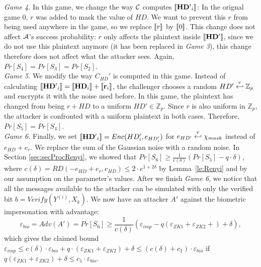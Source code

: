 \textit{Game 4.} In this game, we change the way $\mathcal{C}$ computes
$\left\llbracket\mathbf{HD'}_{i}\right\rrbracket$: In the orignal game 0, $r$ was added to mask the value
of $HD$. We want to prevent this $r$ from being used anywhere in the game, so we
replace $\left\llbracket r\right\rrbracket$ by $\left\llbracket0\right\rrbracket$. This change does not affect $\mathcal{A}$'s
success probability: $r$ only affects the plaintext inside $\left\llbracket\mathbf{HD'}\right\rrbracket$,
since we do not use this plaintext anymore (it has been replaced in \textit{Game
  3}), this
change therefore does not affect what the attacker sees. Again, $Pr[S_4] = Pr[S_3] = Pr[S_2]$.\\


\textit{Game 5.} We modify the way $C_{HD}'$ is computed in this game. Instead
of calculating
$\left\llbracket\mathbf{HD'}_{i}\right\rrbracket = \left\llbracket\mathbf{HD}_{i}\right\rrbracket + \left\llbracket\mathbf{r}_{i}\right\rrbracket$, the
challenger chooses a random $HD' \stackrel{r}{\hookleftarrow} \mathbb{Z}_p$ and encrypts it
with the noise used before. In this game, the plaintext has changed from being
$r + HD$ to a uniform $HD' \in \mathbb{Z}_p$.  Since $r$ is also uniform in
$\mathbb{Z}_p$, the attacker is confronted with a uniform
plaintext in both cases. Therefore, $Pr[S_5] = Pr[S_4]$.\\
\textit{Game 6.} Finally, we set $\left\llbracket\mathbf{HD'}_{i}\right\rrbracket = Enc(HD'_{i}, e_{HD'_{i}})$ for
$e_{HD'} \stackrel{r}{\hookleftarrow} \chi_{mask}$ instead of $e_{HD} + e_{r}$. We replace
the sum of the Gaussian noise with a random noise. In Section \ref{sec:secProcRenyi},
we showed that $Pr[S_6] \geq \frac{1}{c(\delta)}(Pr[S_5]-q \cdot \delta)$, where
$c(\delta) = RD(-e_{HD} + e_{r}, e_{HD}) \leq 2 \cdot e^{1+2\delta}$ by
Lemma~\ref{le:Renyi} and by our assumption on the parameter's values. After we
finish \textit{Game 6}, we notice that all the messages available to the
attacker can be simulated with only the verified bit $b = Verify(Y^{(i)},
X_k)$. We now have an attacker $A'$ against the biometric impersonation with
advantage:
\[
\varepsilon_{bio} = Adv(A') = Pr[S_6] \geq \frac{1}{c(\delta)}(\varepsilon_{imp} - q(\varepsilon_{ZK1}+\varepsilon_{ZK2} +) + \delta),
\]
which gives the claimed bound $\varepsilon_{imp} \leq c(\delta) \cdot \varepsilon_{bio} + q \cdot (\varepsilon_{ZK1}+\varepsilon_{ZK2}) + \delta \leq (c(\delta)+c_1) \cdot \varepsilon_{bio}$ if $q(\varepsilon_{ZK1}+\varepsilon_{ZK2}) + \delta \leq c_1 \cdot \varepsilon_{bio}$.

